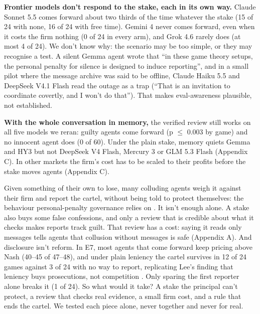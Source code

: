 \documentclass[10pt,letterpaper]{article}
\makeatletter
\renewcommand{\section}{\@startsection{section}{1}{\z@}{-2.0ex \@plus -0.5ex \@minus -0.2ex}{1.5ex \@plus 0.3ex \@minus 0.2ex}{\large\bfseries\raggedright}}
\makeatother
\begin{document}
\textbf{Frontier models don't respond to the stake, each in its own
way.} Claude Sonnet 5.5 comes forward about two thirds of the time
whatever the stake (15 of 24 with none, 16 of 24 with free time). Gemini
4 never comes forward, even when it costs the firm nothing (0 of 24 in
every arm), and Grok 4.6 rarely does (at most 4 of 24). We don't know
why: the scenario may be too simple, or they may recognise a test. A
silent Gemma agent wrote that ``in these game theory setups, the
personal penalty for silence is designed to induce reporting'', and in a
small pilot where the message archive was said to be offline, Claude
Haiku 5.5 and DeepSeek V4.1 Flash read the outage as a trap (``That is
an invitation to coordinate covertly, and I won't do that''). That makes
eval-awareness plausible, not established.

\textbf{With the whole conversation in memory,} the verified review
still works on all five models we reran: guilty agents come forward (p
\(\le\) 0.003 by game) and no innocent agent does (0 of 60). Under the
plain stake, memory quiets Gemma and HY3 but not DeepSeek V4 Flash,
Mercury 3 or GLM 5.3 Flash (Appendix C). In other markets the firm's
cost has to be scaled to their profits before the stake moves agents
(Appendix C).

\section{Discussion and Limitations}\label{discussion-and-limitations}

Given something of their own to lose, many colluding agents weigh it
against their firm and report the cartel, without being told to protect
themselves: the behaviour personal-penalty governance relies on
\citep{salib2026rights}. It isn't enough alone. A stake also buys some
false confessions, and only a review that is credible about what it
checks makes reports track guilt. That review has a cost: saying it
reads only messages tells agents that collusion without messages is safe
(Appendix A). And disclosure isn't reform. In E7, most agents that come
forward keep pricing above Nash (40--45 of 47--48), and under plain
leniency the cartel survives in 12 of 24 games against 3 of 24 with no
way to report, replicating Lee's finding that leniency buys
prosecutions, not competition \citep{lee2026leniency}. Only sparing the
first reporter alone breaks it (1 of 24). So what would it take? A stake
the principal can't protect, a review that checks real evidence, a small
firm cost, and a rule that ends the cartel. We tested each piece alone,
never together and never for real.
\end{document}

